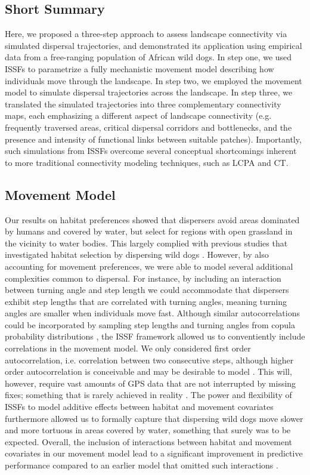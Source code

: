 \documentclass[abstract=on,10pt,a4paper,bibliography=totocnumbered]{article}
\begin{document}
\subsection{Short Summary}
Here, we proposed a three-step approach to assess landscape connectivity via
simulated dispersal trajectories, and demonstrated its application using
empirical data from a free-ranging population of African wild dogs. In step one,
we used ISSFs to parametrize a fully mechanistic movement model describing how
individuals move through the landscape. In step two, we employed the movement
model to simulate dispersal trajectories across the landscape. In step three, we
translated the simulated trajectories into three complementary connectivity
maps, each emphasizing a different aspect of landscape connectivity (e.g.
frequently traversed areas, critical dispersal corridors and bottlenecks, and
the presence and intensity of functional links between suitable patches).
Importantly, such simulations from ISSFs overcome several conceptual
shortcomings inherent to more traditional connectivity modeling techniques, such
as LCPA and CT.

\subsection{Movement Model}
Our results on habitat preferences showed that dispersers avoid areas dominated
by humans and covered by water, but select for regions with open grassland in
the vicinity to water bodies. This largely complied with previous studies that
investigated habitat selection by dispersing wild dogs
\citep{DaviesMostert.2012, Masenga.2016, Woodroffe.2019, Oneill.2020,
Hofmann.2021}. However, by also accounting for movement preferences, we were
able to model several additional complexities common to dispersal. For instance,
by including an interaction between turning angle and step length we could
accommodate that dispersers exhibit step lengths that are correlated with
turning angles, meaning turning angles are smaller when individuals move fast.
Although similar autocorrelations could be incorporated by sampling step lengths
and turning angles from copula probability distributions \citep{Hodel.2021a,
Hodel.2021b}, the ISSF framework allowed us to conventiently include
correlations in the movement model. We only considered first order
autocorrelation, i.e. correlation between two consecutive steps, although higher
order autocorrelation is conceivable and may be desirable to model
\citep{Dray.2010, McClintock.2012}. This will, however, require vast amounts of
GPS data that are not interrupted by missing fixes; something that is rarely
achieved in reality \citep{Graves.2006}. The power and flexibility of ISSFs to
model additive effects between habitat and movement covariates
\citep{Avgar.2016, Signer.2017} furthermore allowed us to formally capture that
dispersing wild dogs move slower and more tortuous in areas covered by water,
something that surely was to be expected. Overall, the inclusion of interactions
between habitat and movement covariates in our movement model lead to a
significant improvement in predictive performance compared to an earlier model
that omitted such interactions \citep{Hofmann.2021}.
\end{document}
